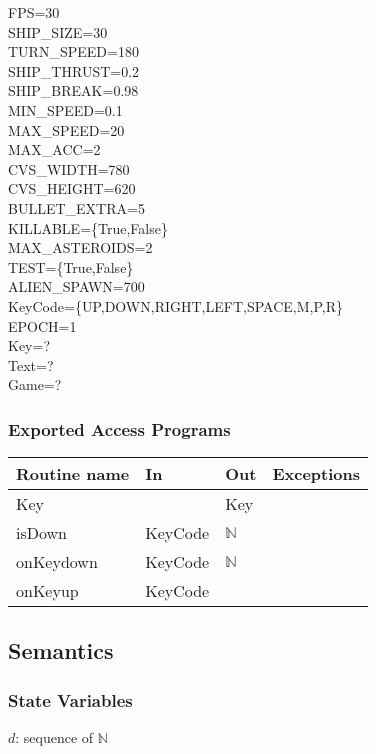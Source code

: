 \documentclass[12pt]{article}
\begin{document}
FPS=30\\
SHIP\_SIZE=30\\
TURN\_SPEED=180\\
SHIP\_THRUST=0.2\\
SHIP\_BREAK=0.98\\
MIN\_SPEED=0.1\\
MAX\_SPEED=20\\
MAX\_ACC=2\\
CVS\_WIDTH=780\\
CVS\_HEIGHT=620\\
BULLET\_EXTRA=5\\
KILLABLE=\{True,False\}\\
MAX\_ASTEROIDS=2\\
TEST=\{True,False\}\\
ALIEN\_SPAWN=700\\
KeyCode=\{UP,DOWN,RIGHT,LEFT,SPACE,M,P,R\}\\
EPOCH=1\\
Key=?\\
Text=?\\
Game=?\\

\subsubsection*{Exported Access Programs}

\begin{tabular}{| l | l | l | l |} %
\hline
\textbf{Routine name} & \textbf{In} & \textbf{Out} & \textbf{Exceptions}\\
\hline
Key &  & Key & ~\\
\hline
isDown & KeyCode & $\mathbb{N}$ & ~\\
\hline
onKeydown & KeyCode & $\mathbb{N}$ & ~\\
\hline
onKeyup & KeyCode &  & ~\\
\hline
\end{tabular}

\subsection*{Semantics}

\subsubsection*{State Variables}

$d$: sequence of $\mathbb{N}$\\
\end{document}
